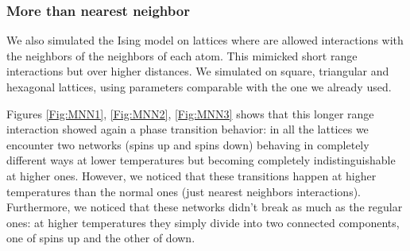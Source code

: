 \newpage 

\subsubsection*{More than nearest neighbor}
We also simulated the Ising model on lattices where are allowed interactions with the neighbors of the neighbors of each atom. This mimicked short range interactions but over higher distances. We simulated on square, triangular and hexagonal lattices, using parameters comparable  with the one we already used.

Figures \ref{Fig:MNN1}, \ref{Fig:MNN2}, \ref{Fig:MNN3} shows that this longer range interaction showed again a phase transition behavior: in all the lattices we encounter two networks (spins up and spins down) behaving in completely different ways at lower temperatures but becoming completely indistinguishable at higher ones. However, we noticed that these transitions happen at higher temperatures than the normal ones (just nearest neighbors interactions). Furthermore, we noticed that these networks didn't break as much as the regular ones: at higher temperatures they simply divide into two connected components, one of spins up and the other of down.

